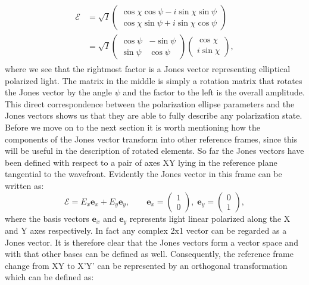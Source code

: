 \begin{align}
\begin{split}
    \bm{\mathcal{E}} &=
    \sqrt{I}
    \begin{pmatrix}
    \cos \chi \cos \psi - i\sin \chi \sin \psi \\
    \cos \chi \sin \psi + i\sin \chi \cos \psi
    \end{pmatrix}
    \\
    &=
    \sqrt{I}
    \begin{pmatrix}
    \cos \psi & -\sin \psi \\
    \sin \psi & \cos \psi
    \end{pmatrix}
    \begin{pmatrix}
    \cos \chi \\
    i\sin \chi
    \end{pmatrix},
\end{split}
\end{align}
where we see that the rightmost factor is a Jones vector representing elliptical polarized light. The matrix in the middle is simply a rotation matrix that rotates the Jones vector by the angle $\psi$ and the factor to the left is the overall amplitude. This direct correspondence between the polarization ellipse parameters and the Jones vectors shows us that they are able to fully describe any polarization state. Before we move on to the next section it is worth mentioning how the components of the Jones vector transform into other reference frames, since this will be useful in the description of rotated elements. So far the Jones vectors have been defined with respect to a pair of axes XY lying in the reference plane tangential to the wavefront. Evidently the Jones vector in this frame can be written as:
\begin{equation}
    \bm{\mathcal{E}} = E_x \bm{e}_x + E_y \bm{e}_y, \qquad 
    \bm{e}_x = 
    \begin{pmatrix}
    1 \\
    0
    \end{pmatrix},
    \;
    \bm{e}_y = 
    \begin{pmatrix}
    0 \\
    1
    \end{pmatrix},
\end{equation}
where the basis vectors $\bm{e}_x$ and $\bm{e}_y$ represents light linear polarized along the X and Y axes respectively. In fact any complex 2x1 vector can be regarded as a Jones vector. It is therefore clear that the Jones vectors form a vector space and with that other bases can be defined as well. Consequently, the reference frame change from XY to X'Y' can be represented by an orthogonal transformation which can be defined as:
